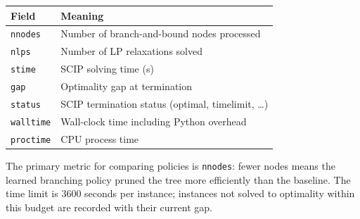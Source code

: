 \begin{center}
\begin{tabular}{ll}
\toprule
\textbf{Field} & \textbf{Meaning} \\
\midrule
\texttt{nnodes}   & Number of branch-and-bound nodes processed \\
\texttt{nlps}     & Number of LP relaxations solved \\
\texttt{stime}    & SCIP solving time (s) \\
\texttt{gap}      & Optimality gap at termination \\
\texttt{status}   & SCIP termination status (optimal, timelimit, \ldots) \\
\texttt{walltime} & Wall-clock time including Python overhead \\
\texttt{proctime} & CPU process time \\
\bottomrule
\end{tabular}
\end{center}

The primary metric for comparing policies is \texttt{nnodes}: fewer nodes means the learned branching policy pruned the tree more efficiently than the baseline. The time limit is 3600 seconds per instance; instances not solved to optimality within this budget are recorded with their current gap.
